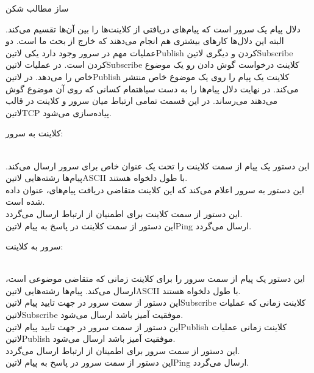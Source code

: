 \documentclass[]{article}
\begin{document}
  ‌ساز
  ‌مطالب
  ‌شکن


  دلال پیام یک سرور است که پیام‌های دریافتی از کلاینت‌ها را بین آن‌ها تقسیم می‌کند. البته این دلال‌ها کارهای بیشتری هم انجام می‌دهند که خارج از بحث ما است.
  دو عملیات مهم در سرور وجود دارد یکی ‌لاتین{Publish} کردن و دیگری ‌لاتین{Subscribe} کردن است. در عملیات ‌لاتین{Subscribe} کلاینت درخواست گوش دادن رو یک موضوع خاص را می‌دهد.
  در ‌لاتین{Publish} کلاینت یک پیام را روی یک موضوع خاص منتشر می‌کند. در نهایت دلال پیام‌ها را به دست ‌سیاه{تمام} کسانی که روی آن موضوع گوش می‌دهند می‌رساند.
  در این قسمت تمامی ارتباط میان سرور و کلاینت در قالب ‌لاتین{TCP} پیاده‌سازی می‌شود.


  کلاینت به سرور:

    \\ این دستور یک پیام از سمت کلاینت را تحت یک عنوان خاص برای سرور ارسال می‌کند. پیام‌ها رشته‌هایی ‌لاتین{ASCII} با طول دلخواه هستند.
    \\ این دستور به سرور اعلام می‌کند که این کلاینت متقاضی دریافت پیام‌های، عنوان داده شده است.
    \\ این دستور از سمت کلاینت برای اطمنیان از ارتباط ارسال می‌گردد.
    \\ این دستور از سمت کلاینت در پاسخ به پیام ‌لاتین{Ping} ارسال می‌گردد.

  سرور به کلاینت:

    \\ این دستور یک پیام از سمت سرور را برای کلاینت زمانی که متقاضی موضوعی است، ارسال می‌کند. پیام‌ها رشته‌هایی ‌لاتین{ASCII} با طول دلخواه هستند.
    \\ این دستور از سمت سرور در جهت تایید پیام ‌لاتین{Subscribe} کلاینت زمانی که عملیات ‌لاتین{Subscribe} موفقیت آمیز باشد ارسال می‌شود.
    \\ این دستور از سمت سرور در جهت تایید پیام ‌لاتین{Publish} کلاینت زمانی عملیات ‌لاتین{Publish} موفقیت آمیز باشد ارسال می‌شود.
    \\ این دستور از سمت سرور برای اطمینان از ارتباط ارسال می‌گردد.
    \\ این دستور از سمت سرور در پاسخ به پیام ‌لاتین{Ping} ارسال می‌گردد.
\end{document}
